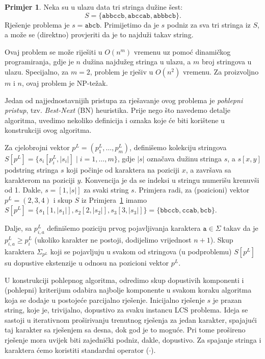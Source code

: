 \documentclass[b5paper, utf8, 11pt, colorlinks]{book}
\theoremstyle{definition}
\newtheorem{primjer}{Primjer}[chapter]
\begin{document}
\begin{primjer}\label{primjer:lcs}
 Neka su u ulazu data tri stringa dužine šest: $$S = \{  \texttt{abbccb}, \texttt{abccab}, \texttt{abbbcb}   \}.$$  Rješenje problema je $s=\texttt{abcb}$. Primijetimo da je $s$ podniz za sva tri stringa iz $S$, a može se (direktno) provjeriti da je to najduži takav string. 
 \end{primjer}
 
 Ovaj problem se može riješiti u $O(n^m)$ vremenu uz pomoć dinamičkog programiranja, gdje je $n$ dužina najdužeg stringa u ulazu, a $m$ broj stringova u ulazu. Specijalno, za  $m=2$, problem je rješiv u $O(n^2)$ vremenu. Za proizvoljno $m$ i $n$, ovaj problem je NP-težak.  


Jedan od najjednostavnijih pristupa za rješavanje ovog problema je  \emph{pohlepni pristup}, tzv. \emph{Best-Next} (BN) heuristika. Prije nego što navedemo detalje algoritma, uvedimo nekoliko definicija i oznaka koje će biti korištene u konstrukciji ovog algoritma. 

Za cjelobrojni vektor $p^L = (p^L_1,\ldots, p^L_m)$, definišemo kolekciju stringova
$S[p^L] = \{s_i[p^L_i, |s_i|] \mid i=1,\ldots,m\}$, gdje $|s|$ označava dužinu stringa $s$, a $s[x,y]$ podstring stringa $s$ koji počinje od karaktera na poziciji $x$, a završava sa karakterom na poziciji $y$. Konvencija je da se indeksi u stringu numerišu krenuvši od 1. Dakle, $s= [1, |s|]$ za svaki string $s$. Primjera radi, za (pozicioni) vektor $p^L=(2,3,4)$ i skup $S$ iz Primjera~\ref{primjer:lcs} imamo $S[ p^L] = \{ s_1[1, |s_1|], s_2[2, |s_2|], s_3[3, |s_3|]  \}= \{ \texttt{bbccb}, \texttt{ccab}, \texttt{bcb}\}$. 

 
Dalje, sa $p^L_{i,a}$ definišemo poziciju prvog pojavljivanja karaktera $\texttt{a}\in \Sigma$ takav da je $p^L_{i,a} \geq p^L_i$ (ukoliko karakter ne postoji, dodijelimo vrijednost $n+1$). Skup karaktera $\Sigma_{p^L}$ koji se pojavljuju u svakom od stringova (u podproblemu) $S[p^L]$ su dopustive ekstenzije u odnosu na pozicioni vektor $p^L$. 

U konstrukciji pohlepnog algoritma, odredimo  skup dopustivih komponenti i (pohlepni) kriterijum odabira najbolje komponente u svakom koraku algoritma koja se dodaje u postojeće parcijalno rješenje. Inicijalno rješenje $s$ je prazan string, koje je, trivijalno, dopustivo za svaku instancu LCS problema. Ideja se sastoji u iterativnom proširivanju trenutnog rješenja za jedan karakter, spajajući taj karakter sa rješenjem sa desna, dok god je to moguće. Pri tome prošireno rješenje mora uvijek biti zajednički podniz, dakle, dopustivo. Za spajanje stringa i karaktera ćemo koristiti standardni operator ($\cdot$).
\end{document}

